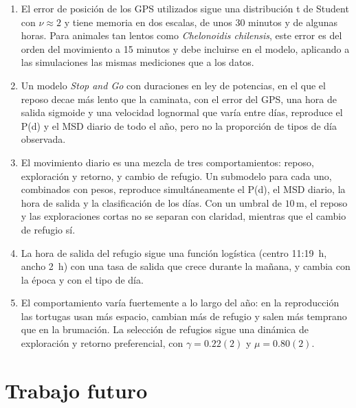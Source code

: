 \begin{enumerate}
    \item El error de posición de los GPS utilizados sigue una distribución t de Student con $\nu \approx 2$ y tiene memoria en dos escalas, de unos
    30 minutos y de algunas horas. Para animales tan lentos como \textit{Chelonoidis chilensis}, este error es del orden del movimiento a 15 minutos y
    debe incluirse en el modelo, aplicando a las simulaciones las mismas mediciones que a los datos.
    \item Un modelo \textit{Stop and Go} con duraciones en ley de potencias, en el que el reposo decae más lento que la caminata, con el error del GPS,
    una hora de salida sigmoide y una velocidad lognormal que varía entre días, reproduce el P(d) y el MSD diario de todo el año, pero no la proporción de
    tipos de día observada.
    \item El movimiento diario es una mezcla de tres comportamientos: reposo, exploración y retorno, y cambio de refugio. Un submodelo para cada uno,
    combinados con pesos, reproduce simultáneamente el P(d), el MSD diario, la hora de salida y la clasificación de los días. Con un umbral de
    $10\,\mathrm{m}$, el reposo y las exploraciones cortas no se separan con claridad, mientras que el cambio de refugio sí.
    \item La hora de salida del refugio sigue una función logística (centro 11:19~h, ancho 2~h) con una tasa de salida que crece durante la mañana, y
    cambia con la época y con el tipo de día.
    \item El comportamiento varía fuertemente a lo largo del año: en la reproducción las tortugas usan más espacio, cambian más de refugio y salen más
    temprano que en la brumación. La selección de refugios sigue una dinámica de exploración y retorno preferencial, con $\gamma = 0.22(2)$ y
    $\mu = 0.80(2)$.
\end{enumerate}

\section{Trabajo futuro}\label{IV:futuro}

